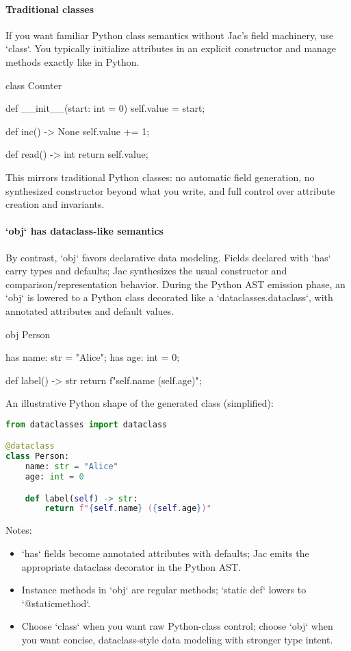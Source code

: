 \paragraph{Traditional classes}

If you want familiar Python class semantics without Jac's field machinery, use `class`. You typically initialize attributes in an explicit constructor and manage methods exactly like in Python.

\begin{jacblock}
class Counter {
    def __init__(start: int = 0) {
        self.value = start;
    }

    def inc() -> None { self.value += 1; }

    def read() -> int { return self.value; }
}
\end{jacblock}

This mirrors traditional Python classes: no automatic field generation, no synthesized constructor beyond what you write, and full control over attribute creation and invariants.

\paragraph{`obj` has dataclass-like semantics}

By contrast, `obj` favors declarative data modeling. Fields declared with `has` carry types and defaults; Jac synthesizes the usual constructor and comparison/representation behavior. During the Python AST emission phase, an `obj` is lowered to a Python class decorated like a `dataclasses.dataclass`, with annotated attributes and default values.

\begin{jacblock}
obj Person {
    has name: str = "Alice";
    has age: int = 0;

    def label() -> str { return f"{self.name} ({self.age})"; }
}
\end{jacblock}

An illustrative Python shape of the generated class (simplified):

\begin{lstlisting}[language=Python]
from dataclasses import dataclass

@dataclass
class Person:
    name: str = "Alice"
    age: int = 0

    def label(self) -> str:
        return f"{self.name} ({self.age})"
\end{lstlisting}

Notes:
\begin{itemize}
    \item `has` fields become annotated attributes with defaults; Jac emits the appropriate dataclass decorator in the Python AST.
    \item Instance methods in `obj` are regular methods; `static def` lowers to `@staticmethod`.
    \item Choose `class` when you want raw Python-class control; choose `obj` when you want concise, dataclass-style data modeling with stronger type intent.
\end{itemize}

